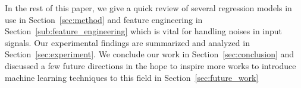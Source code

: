 In the rest of this paper, we give a quick review of several regression models in use in Section~\ref{sec:method} and feature engineering in Section~\ref{sub:feature_engineering} which is vital for handling noises in input signals. Our experimental findings are summarized and analyzed in Section~\ref{sec:experiment}. We conclude our work in Section~\ref{sec:conclusion} and discussed a few future directions in the hope to inspire more works to introduce machine learning techniques to this field in Section~\ref{sec:future_work}
